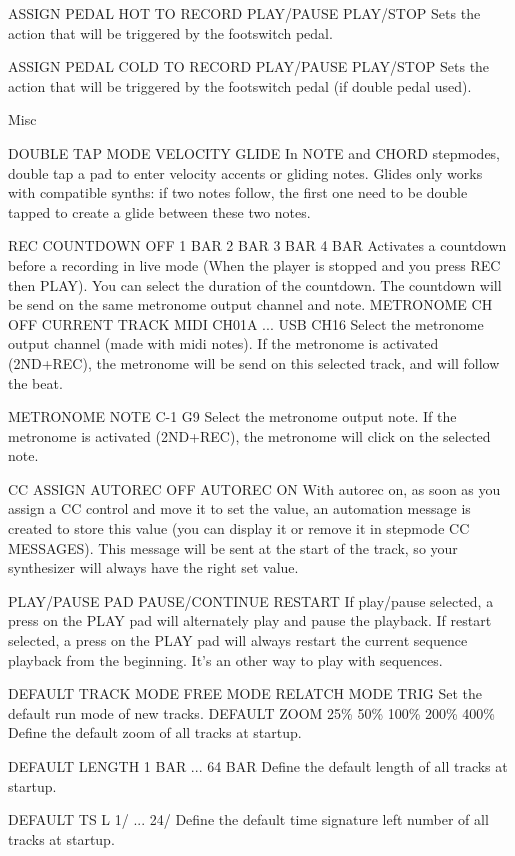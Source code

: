 ASSIGN PEDAL HOT TO   RECORD   PLAY/PAUSE   PLAY/STOP  
Sets the action that will be triggered by the footswitch pedal. 

 ASSIGN PEDAL COLD TO   RECORD   PLAY/PAUSE   PLAY/STOP  
Sets the action that will be triggered by the footswitch pedal (if double pedal used).

Misc

 DOUBLE TAP MODE   VELOCITY   GLIDE 
In NOTE and CHORD stepmodes, double tap a pad to enter velocity accents or gliding notes. Glides only works with compatible synths: if two notes follow, the first one need to be double tapped to create a glide between these two notes. 

 REC COUNTDOWN   OFF   1 BAR   2 BAR   3 BAR   4 BAR 
Activates a countdown before a recording in live mode (When the player is stopped and you press REC then PLAY). You can select the duration of the countdown. The countdown will be send on the same metronome output channel and note.
 METRONOME CH   OFF   CURRENT TRACK   MIDI CH01A   ...   USB CH16 
Select the metronome output channel (made with midi notes). If the metronome is activated (2ND+REC), the metronome will be send on this selected track, and will follow the beat.

 METRONOME NOTE   C-1   G9 
Select the metronome output note. If the metronome is activated (2ND+REC), the metronome will click on the selected note.

 CC ASSIGN   AUTOREC OFF   AUTOREC ON 
With autorec on, as soon as you assign a CC control and move it to set the value, an automation message is created to store this value (you can display it or remove it in stepmode CC MESSAGES). This message will be sent at the start of the track, so your synthesizer will always have the right set value. 

 PLAY/PAUSE PAD   PAUSE/CONTINUE   RESTART 
If play/pause selected, a press on the PLAY pad will alternately play and pause the playback. If restart selected, a press on the PLAY pad will always restart the current sequence playback from the beginning. It's an other way to play with sequences. 

 DEFAULT TRACK   MODE FREE   MODE RELATCH   MODE TRIG 
Set the default run mode of new tracks. 
 DEFAULT ZOOM   25\%   50\%   100\%   200\%   400\% 
Define the default zoom of all tracks at startup.

 DEFAULT LENGTH   1 BAR   ...   64 BAR 
Define the default length of all tracks at startup.

 DEFAULT TS L   1/   ...   24/ 
Define the default time signature left number of all tracks at startup.

